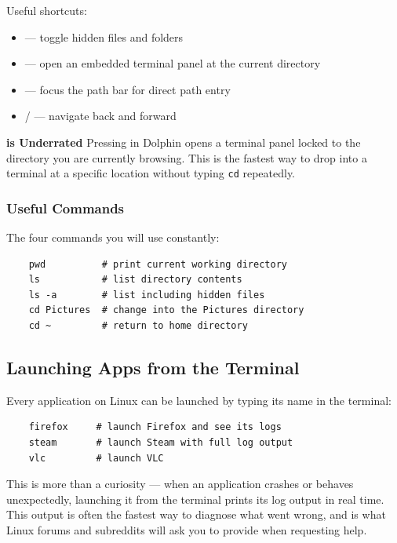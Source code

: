 \documentclass{article}
\newcommand{\code}[1]{\colorbox{codebg}{\texttt{#1}}}
\begin{document}
Useful shortcuts:

\begin{itemize}[leftmargin=1.5em, nosep, label={\tiny\textbullet}]
	\item {} --- toggle hidden files and folders
	\item {} --- open an embedded terminal panel at the current directory
	\item {} --- focus the path bar for direct path entry
	\item {} /  --- navigate back and forward
\end{itemize}

\begin{callout}{\textbf{ is Underrated}}
	Pressing  in Dolphin opens a terminal panel locked to the directory you
	are currently browsing. This is the fastest way to drop into a terminal at a
	specific location without typing \code{cd} repeatedly.
\end{callout}

\subsubsection{Useful Commands}

The four commands you will use constantly:

\begin{verbatim}
	pwd          # print current working directory
	ls           # list directory contents
	ls -a        # list including hidden files
	cd Pictures  # change into the Pictures directory
	cd ~         # return to home directory
\end{verbatim}

\subsection{Launching Apps from the Terminal}

Every application on Linux can be launched by typing its name in the terminal:

\begin{verbatim}
	firefox     # launch Firefox and see its logs
	steam       # launch Steam with full log output
	vlc         # launch VLC
\end{verbatim}

This is more than a curiosity --- when an application crashes or behaves unexpectedly,
launching it from the terminal prints its log output in real time. This output is
often the fastest way to diagnose what went wrong, and is what Linux forums and
subreddits will ask you to provide when requesting help.
\newpage
\end{document}
